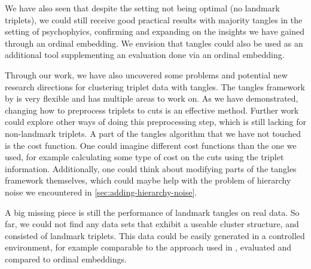 We have also seen that despite the setting not being optimal (no landmark triplets), we could still receive good practical results with majority tangles in the setting of psychophyics, 
confirming and expanding on the insights we have gained through an ordinal embedding. We envision that tangles could also be used as an additional tool supplementing an evaluation done via an ordinal embedding. 

Through our work, we have also uncovered some problems and potential new research directions for clustering triplet data with tangles. 
The tangles framework by \cite{klepperClusteringTanglesAlgorithmic2021} is very flexible and has multiple areas to work on. As we have demonstrated, changing how to 
preprocess triplets to cuts is an effective method. Further work could explore other ways of doing this preprocessing step, which is still lacking for non-landmark triplets. 
A part of the tangles algorithm that we have not touched is the cost function. One could imagine different cost functions than the one we used, for example calculating some 
type of cost on the cuts using the triplet information. Additionally, one could think about modifying parts of the tangles framework themselves, which could maybe help with the problem of hierarchy noise we encountered in \autoref{sec:adding-hierarchy-noise}.

A big missing piece is still the performance of landmark tangles on real data. So far, we could not find any data sets that exhibit a useable cluster structure, and consisted of landmark 
triplets. This data could be easily generated in a controlled environment, for example comparable to the approach used in \cite{inesschonmannSimilarityJudgementsNatural2021}, evaluated and compared to ordinal embeddings. 

